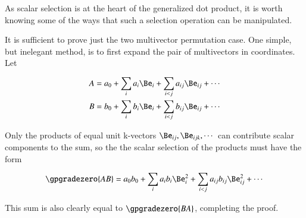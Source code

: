 %
%
As scalar selection is at the heart of the
generalized dot product, it is worth knowing
some of the ways that such a selection operation can be manipulated.


It is sufficient to prove just the two multivector permutation case.
One simple, but inelegant method, is to first expand the pair of multivectors in coordinates.
Let

\begin{equation}\label{eqn:scalarSelectionPermutation:40}
\begin{aligned}
A &= a_0 + \sum_i a_i \Be_i + \sum_{i < j} a_{ij} \Be_{ij} + \cdots \\
B &= b_0 + \sum_i b_i \Be_i + \sum_{i < j} b_{ij} \Be_{ij} + \cdots
\end{aligned}
\end{equation}

Only the products of equal unit k-vectors \( \Be_{ij}, \Be_{ijk}, \cdots \)  can contribute scalar components to the sum, so the
the scalar selection of the products must have the form

\begin{dmath}\label{eqn:scalarSelectionPermutation:60}
\gpgradezero{ A B }
=
a_0 b_0 + \sum_i a_i b_i \Be_i^2 + \sum_{i < j} a_{ij} b_{ij} \Be_{ij}^2 + \cdots
\end{dmath}

This sum is also clearly equal to \( \gpgradezero{ B A } \), completing the proof.
